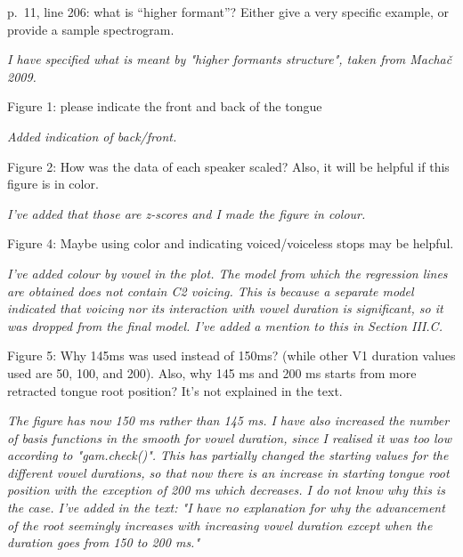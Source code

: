 \documentclass[]{article}
\begin{document}
p.~11, line 206: what is ``higher formant''? Either give a very specific
example, or provide a sample spectrogram.

\begin{adjustwidth}{1cm}{} \textit{
I have specified what is meant by "higher formants structure", taken from Machač 2009.
} \end{adjustwidth}

Figure 1: please indicate the front and back of the tongue

\begin{adjustwidth}{1cm}{} \textit{
Added indication of back/front.
} \end{adjustwidth}

Figure 2: How was the data of each speaker scaled? Also, it will be
helpful if this figure is in color.

\begin{adjustwidth}{1cm}{} \textit{
I've added that those are z-scores and I made the figure in colour.
} \end{adjustwidth}

Figure 4: Maybe using color and indicating voiced/voiceless stops may be
helpful.

\begin{adjustwidth}{1cm}{} \textit{
I've added colour by vowel in the plot. The model from which the regression lines are obtained does not contain C2 voicing. This is because a separate model indicated that voicing nor its interaction with vowel duration is significant, so it was dropped from the final model. I've added a mention to this in Section III.C.
} \end{adjustwidth}

Figure 5: Why 145ms was used instead of 150ms? (while other V1 duration
values used are 50, 100, and 200). Also, why 145 ms and 200 ms starts
from more retracted tongue root position? It's not explained in the
text.

\begin{adjustwidth}{1cm}{} \textit{
The figure has now 150 ms rather than 145 ms. I have also increased the number of basis functions in the smooth for vowel duration, since I realised it was too low according to "gam.check()". This has partially changed the starting values for the different vowel durations, so that now there is an increase in starting tongue root position with the exception of 200 ms which decreases. I do not know why this is the case. I've added in the text: "I have no explanation for why the advancement of the root seemingly increases with increasing vowel duration except when the duration goes from 150 to 200 ms."
} \end{adjustwidth}
\end{document}
